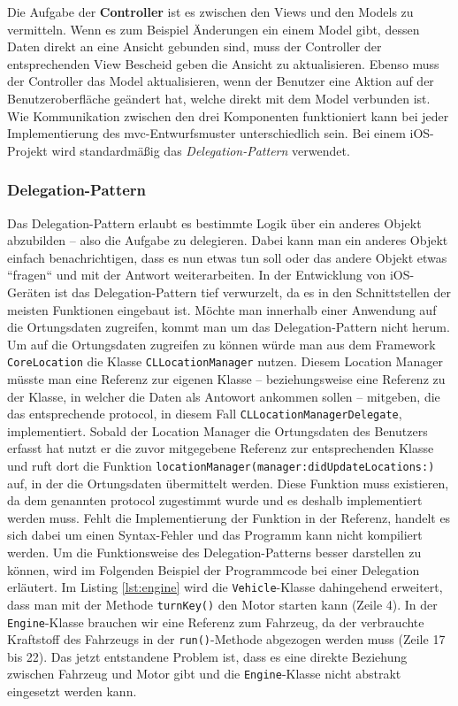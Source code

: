 %
Die Aufgabe der \textbf{Controller} ist es zwischen den Views und den Models zu vermitteln.
Wenn es zum Beispiel Änderungen ein einem Model gibt, dessen Daten direkt an eine Ansicht gebunden sind, muss der Controller der entsprechenden View Bescheid geben die Ansicht zu aktualisieren.
Ebenso muss der Controller das Model aktualisieren, wenn der Benutzer eine Aktion auf der Benutzeroberfläche geändert hat, welche direkt mit dem Model verbunden ist.
Wie Kommunikation zwischen den drei Komponenten funktioniert kann bei jeder Implementierung des \ac{mvc}-Entwurfsmuster unterschiedlich sein.
Bei einem iOS-Projekt wird standardmäßig das \textit{Delegation-Pattern} verwendet.

\subsubsection{Delegation-Pattern}
Das Delegation-Pattern erlaubt es bestimmte Logik über ein anderes Objekt abzubilden – also die Aufgabe zu delegieren.
Dabei kann man ein anderes Objekt einfach benachrichtigen, dass es nun etwas tun soll oder das andere Objekt etwas ``fragen`` und mit der Antwort weiterarbeiten.
In der Entwicklung von iOS-Geräten ist das Delegation-Pattern tief verwurzelt, da es in den Schnittstellen der meisten Funktionen eingebaut ist.
Möchte man innerhalb einer Anwendung auf die Ortungsdaten zugreifen, kommt man um das Delegation-Pattern nicht herum.\pbreak%
%
Um auf die Ortungsdaten zugreifen zu können würde man aus dem Framework \texttt{CoreLocation} die Klasse \texttt{CLLocationManager} nutzen.
Diesem Location Manager müsste man eine Referenz zur eigenen Klasse – beziehungsweise eine Referenz zu der Klasse, in welcher die Daten als Antowort ankommen sollen – mitgeben, die das entsprechende \Gls{protocol}, in diesem Fall \texttt{CLLocationManagerDelegate}, implementiert.
Sobald der Location Manager die Ortungsdaten des Benutzers erfasst hat nutzt er die zuvor mitgegebene Referenz zur entsprechenden Klasse und ruft dort die Funktion \texttt{locationManager(manager:didUpdateLocations:)} auf, in der die Ortungsdaten übermittelt werden.
Diese Funktion muss existieren, da dem genannten \Gls{protocol} zugestimmt wurde und es deshalb implementiert werden muss.
Fehlt die Implementierung der Funktion in der Referenz, handelt es sich dabei um einen Syntax-Fehler und das Programm kann nicht kompiliert werden.\pbreak%
%
Um die Funktionsweise des Delegation-Patterns besser darstellen zu können, wird im Folgenden Beispiel der Programmcode bei einer Delegation erläutert.
Im Listing \ref{lst:engine} wird die \texttt{Vehicle}-Klasse dahingehend erweitert, dass man mit der Methode \texttt{turnKey()} den Motor starten kann (Zeile 4).
In der \texttt{Engine}-Klasse brauchen wir eine Referenz zum Fahrzeug, da der verbrauchte Kraftstoff des Fahrzeugs in der \texttt{run()}-Methode abgezogen werden muss (Zeile 17 bis 22).
Das jetzt entstandene Problem ist, dass es eine direkte Beziehung zwischen Fahrzeug und Motor gibt und die \texttt{Engine}-Klasse nicht abstrakt eingesetzt werden kann.\\

